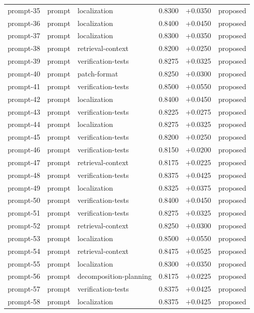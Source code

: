 \begin{center}
\begin{longtable}{llp{5.2cm}rrl}
prompt-35 & prompt & localization & 0.8300 & +0.0350 & proposed \\
prompt-36 & prompt & localization & 0.8400 & +0.0450 & proposed \\
prompt-37 & prompt & localization & 0.8300 & +0.0350 & proposed \\
prompt-38 & prompt & retrieval-context & 0.8200 & +0.0250 & proposed \\
prompt-39 & prompt & verification-tests & 0.8275 & +0.0325 & proposed \\
prompt-40 & prompt & patch-format & 0.8250 & +0.0300 & proposed \\
prompt-41 & prompt & verification-tests & 0.8500 & +0.0550 & proposed \\
prompt-42 & prompt & localization & 0.8400 & +0.0450 & proposed \\
prompt-43 & prompt & verification-tests & 0.8225 & +0.0275 & proposed \\
prompt-44 & prompt & localization & 0.8275 & +0.0325 & proposed \\
prompt-45 & prompt & verification-tests & 0.8200 & +0.0250 & proposed \\
prompt-46 & prompt & verification-tests & 0.8150 & +0.0200 & proposed \\
prompt-47 & prompt & retrieval-context & 0.8175 & +0.0225 & proposed \\
prompt-48 & prompt & verification-tests & 0.8375 & +0.0425 & proposed \\
prompt-49 & prompt & localization & 0.8325 & +0.0375 & proposed \\
prompt-50 & prompt & verification-tests & 0.8400 & +0.0450 & proposed \\
prompt-51 & prompt & verification-tests & 0.8275 & +0.0325 & proposed \\
prompt-52 & prompt & retrieval-context & 0.8250 & +0.0300 & proposed \\
prompt-53 & prompt & localization & 0.8500 & +0.0550 & proposed \\
prompt-54 & prompt & retrieval-context & 0.8475 & +0.0525 & proposed \\
prompt-55 & prompt & localization & 0.8300 & +0.0350 & proposed \\
prompt-56 & prompt & decomposition-planning & 0.8175 & +0.0225 & proposed \\
prompt-57 & prompt & verification-tests & 0.8375 & +0.0425 & proposed \\
prompt-58 & prompt & localization & 0.8375 & +0.0425 & proposed \\

\end{longtable}
\end{center}
